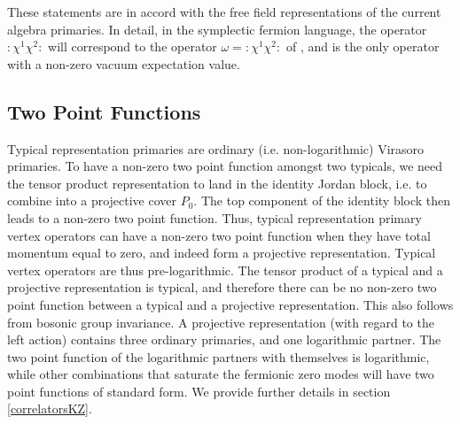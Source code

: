 \documentclass[12pt]{article}
\numberwithin{equation}{section}
\numberwithin{equation}{section}
\numberwithin{table}{section}\setlength{\multlinegap}{25pt}
\begin{document}
These statements are in accord with the free field representations of the current algebra primaries.
In detail, in the symplectic fermion language, the operator $:\chi^1 \chi^2:$ will correspond to
the operator $\omega=:\chi^1 \chi^2:$ of \cite{Kausch:2000fu}, and  is the only operator with a non-zero vacuum expectation value.



\subsection{Two Point Functions}
Typical representation primaries are ordinary (i.e. non-logarithmic) Virasoro primaries.
To have a non-zero two point function amongst two typicals, we need the tensor product
representation to land in the identity Jordan
block, i.e. to combine into a projective cover $P_0$. The top component of the identity block then leads to a non-zero two point 
function. Thus, typical representation primary vertex operators can have
a non-zero two point function when they have total momentum equal to zero, and indeed
form a projective representation. Typical vertex operators are thus pre-logarithmic.
The tensor product of a typical and a projective representation  is typical, and therefore there can be no
non-zero two point function between a typical and a projective representation. This also follows from bosonic
group invariance. A projective representation (with regard to the left action)
contains three ordinary primaries, and one logarithmic partner. The two point function of the logarithmic partners
with themselves is logarithmic, while other combinations that saturate the fermionic zero modes will have
two point functions of standard form. We provide further details in section \ref{correlatorsKZ}.
\end{document}
